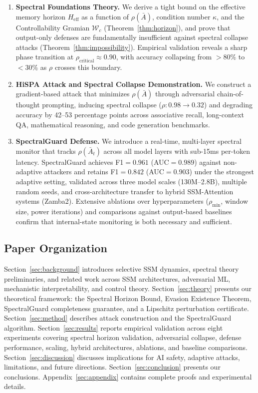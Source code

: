 \documentclass[10pt,twocolumn]{article}
\begin{document}
\begin{enumerate}[label=\textbf{(\arabic*)}]
\item \textbf{Spectral Foundations Theory.} We derive a tight bound on the effective memory horizon $H_{\text{eff}}$ as a function of $\rho(\bar{A})$, condition number $\kappa$, and the Controllability Gramian $\mathcal{W}_c$ (Theorem~\ref{thm:horizon}), and prove that output-only defenses are fundamentally insufficient against spectral collapse attacks (Theorem~\ref{thm:impossibility}). Empirical validation reveals a sharp phase transition at $\rho_{\text{critical}} \approx 0.90$, with accuracy collapsing from $>$80\% to $<$30\% as $\rho$ crosses this boundary.

\item \textbf{HiSPA Attack and Spectral Collapse Demonstration.} We construct a gradient-based attack that minimizes $\rho(\bar{A})$ through adversarial chain-of-thought prompting, inducing spectral collapse ($\rho: 0.98 \to 0.32$) and degrading accuracy by 42--53 percentage points across associative recall, long-context QA, mathematical reasoning, and code generation benchmarks.

\item \textbf{SpectralGuard Defense.} We introduce a real-time, multi-layer spectral monitor that tracks $\rho(\bar{A}_t)$ across all model layers with sub-15ms per-token latency. SpectralGuard achieves F1$=0.961$ (AUC$=0.989$) against non-adaptive attackers and retains F1$=0.842$ (AUC$=0.903$) under the strongest adaptive setting, validated across three model scales (130M--2.8B), multiple random seeds, and cross-architecture transfer to hybrid SSM-Attention systems (Zamba2). Extensive ablations over hyperparameters ($\rho_{\min}$, window size, power iterations) and comparisons against output-based baselines confirm that internal-state monitoring is both necessary and sufficient.
\end{enumerate}

\subsection{Paper Organization}

Section~\ref{sec:background} introduces selective SSM dynamics, spectral theory preliminaries, and related work across SSM architectures, adversarial ML, mechanistic interpretability, and control theory. Section~\ref{sec:theory} presents our theoretical framework: the Spectral Horizon Bound, Evasion Existence Theorem, SpectralGuard completeness guarantee, and a Lipschitz perturbation certificate. Section~\ref{sec:method} describes attack construction and the SpectralGuard algorithm. Section~\ref{sec:results} reports empirical validation across eight experiments covering spectral horizon validation, adversarial collapse, defense performance, scaling, hybrid architectures, ablations, and baseline comparisons. Section~\ref{sec:discussion} discusses implications for AI safety, adaptive attacks, limitations, and future directions. Section~\ref{sec:conclusion} presents our conclusions. Appendix~\ref{sec:appendix} contains complete proofs and experimental details.
\end{document}
